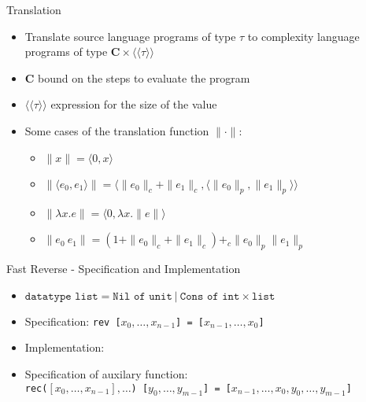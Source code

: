 \documentclass[pdf]{beamer}
\newcommand{\T}[1]{\texttt{#1}}
\newcommand{\LP}{\langle}
\newcommand{\RP}{\rangle}
\newcommand{\LL}{\langle\!\langle}
\newcommand{\RR}{\rangle\!\rangle}
\begin{document}
\begin{frame}{Translation}
  \begin{itemize}
    \item Translate source language programs of type $\tau$ to complexity language programs of type $\textbf{C}\times \LL \tau \RR$
    \vfill
    \item \textbf{C} bound on the steps to evaluate the program
    \vfill
    \item $\LL\tau\RR$ expression for the size of the value
    \vfill
    \item Some cases of the translation function $\|\cdot\|$:
      \begin{itemize}
        \item $\|x\| = \LP 0,x \RP$
        \item $\|\LP e_0,e_1 \RP\| = \LP \|e_0\|_c + \|e_1\|_c, \LP \|e_0\|_p,\|e_1\|_p\RP\RP$
      \item $\|\lambda x.e\| = \LP 0, \lambda x.\|e\|\RP$
      \item $\|e_0\ e_1\| = (1 + \|e_0\|_c + \|e_1\|_c) +_c \|e_0\|_p \|e_1\|_p$
      \end{itemize}
  \end{itemize}
\end{frame}


\begin{frame}{Fast Reverse - Specification and Implementation}
  \begin{itemize}
    \item
        $\T{datatype list} = \T{Nil of unit}\ |\ \T{Cons of int} \times \T{list}$
    \item
      Specification: \T{rev [$x_0,\dots,x_{n-1}$] = [$x_{n-1},\dots,x_0$]}
    \item
      Implementation:
      \usebox{\codebox}
    \item
      Specification of auxilary function:\\
      \T{rec($[x_0,\dots,x_{n-1}],\dots$) [$y_0,\dots,y_{m-1}$] = [$x_{n-1},\dots,x_0,y_0,\dots,y_{m-1}$]}
  \end{itemize}
\end{frame}
\end{document}
